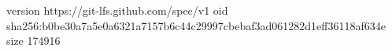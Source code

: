 version https://git-lfs.github.com/spec/v1
oid sha256:b0be30a7a5e0a6321a7157b6c44c29997cbebaf3ad061282d1eff36118af634e
size 174916
